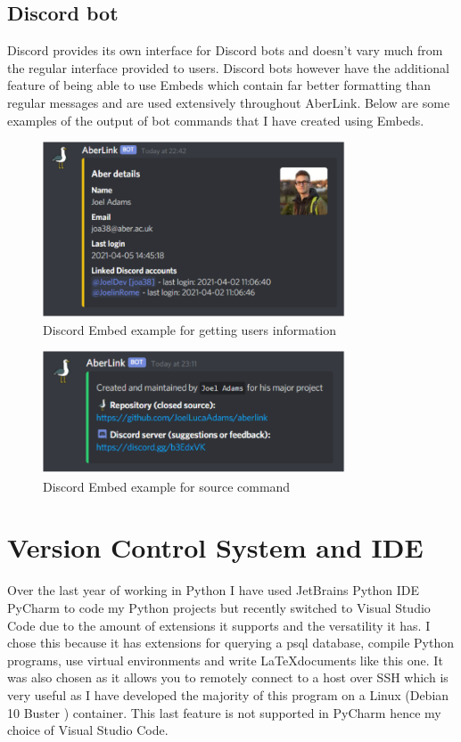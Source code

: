 \subsection{Discord bot}
Discord provides its own interface for Discord bots and doesn't vary much from the regular interface provided to users. Discord bots however have the additional feature of being able to use Embeds which contain far better formatting than regular messages and are used extensively throughout AberLink. Below are some examples of the output of bot commands that I have created using Embeds.
\begin{figure}[H]
	\centering
	\includegraphics[width=0.8\textwidth]{Figures/test-2}
	\caption{Discord Embed example for getting users information}
	\label{fig:dis-go}
\end{figure}
\begin{figure}[H]
	\centering
	\includegraphics[width=0.8\textwidth]{Figures/test}
	\caption{Discord Embed example for source command}
	\label{fig:dis-source}
\end{figure}

\section{Version Control System and IDE}

Over the last year of working in Python I have used JetBrains Python IDE PyCharm \cite{pycharm} to code my Python projects but recently switched to Visual Studio Code \cite{vsc} due to the amount of extensions it supports and the versatility it has. I chose this because it has extensions for querying a psql \cite{psql} database, compile Python programs, use virtual environments and write \LaTeX documents like this one. It was also chosen as it allows you to remotely connect to a host over SSH which is very useful as I have developed the majority of this program on a Linux (Debian 10 Buster \cite{debian}) container. This last feature is not supported in PyCharm hence my choice of Visual Studio Code.

